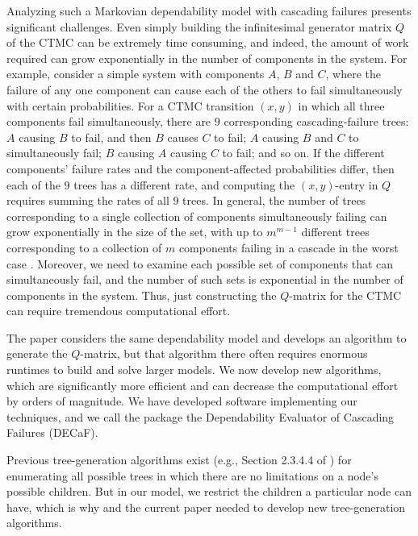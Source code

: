 \documentclass[12pt]{article}
\newcommand{\changed}[1]{#1}
\newcommand{\changed}[1]{\textcolor{red}{#1}}
\begin{document}
Analyzing such a Markovian dependability
model with cascading failures
presents significant challenges.
Even simply
building the infinitesimal
generator matrix $Q$ of the
CTMC can be extremely time consuming,
and indeed, the amount of work required
can grow exponentially in the number
of components in the system.
For example, consider a simple
system with components $A$, $B$ and $C$,
where the failure of any one component
can cause each of the others
to fail simultaneously with certain
probabilities.
For a CTMC transition $(x,y)$ in which
all three components fail simultaneously,
there are $9$ corresponding
cascading-failure
trees:
$A$ causing $B$ to fail, and then $B$
causes $C$ to fail;
$A$ causing $B$ and $C$ to simultaneously fail;
$B$ causing $A$ causing $C$ to fail;
and so on.
If the different
components' failure rates
and the component-affected probabilities
differ, then each of the $9$ trees
has a different rate,
and
computing the $(x,y)$-entry in $Q$
requires summing the rates
of all $9$ trees.
In general, the number of trees
corresponding to a single collection
of components simultaneously failing
can grow exponentially in the size of the
set,
\changed{with up to
$m^{m-1}$ different trees
corresponding to a collection of $m$
components failing in a cascade
in the worst case}
\cite{ING:2009}.
Moreover, we need to examine
each possible set of components
that can simultaneously fail,
and the number of such
sets is exponential in the number
of components in the system.
Thus, just constructing the $Q$-matrix
for the CTMC can require tremendous
computational effort.

The paper \cite{ING:2009}
considers the same dependability model
and develops
an algorithm to generate the $Q$-matrix,
but that algorithm
there often requires enormous
runtimes to build and solve larger models.
We now develop
new algorithms, which are significantly
more efficient and can decrease the
computational effort by orders of magnitude.
We have developed software
implementing our techniques,
and we call the package
the Dependability Evaluator
of Cascading Failures (DECaF).

Previous tree-generation
algorithms exist (e.g.,
Section 2.3.4.4 of \cite{Knut:1997})
for enumerating
all possible trees in which there are
no limitations on a node's possible
children.
But in our model,
we restrict the
children a particular node
can have,
which is why \cite{ING:2009}
and the current paper
needed to develop
new tree-generation
algorithms.
\end{document}
